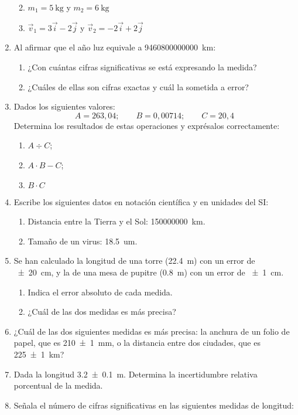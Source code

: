 \documentclass[
]{article}
\begin{document}
\begin{enumerate}
  \begin{enumerate}
  \def\labelenumii{\arabic{enumii}.}
  \item
    \(m_1 = \SI{5}{\kg}\) y \(m_2 = \SI{6}{\kg}\)
  \item
    \(\vec{v}_1 = 3\vec{i} - 2\vec{j}\) y
    \(\vec{v}_2 = -2\vec{i} + 2\vec{j}\)
  \end{enumerate}
\item
  Al afirmar que el año luz equivale a 9460800000000~km:

  \begin{enumerate}
  \def\labelenumii{\arabic{enumii}.}
  \item
    ¿Con cuántas cifras significativas se está expresando la medida?
  \item
    ¿Cuáles de ellas son cifras exactas y cuál la sometida a error?
  \end{enumerate}
\item
  Dados los siguientes valores:
  \[A = 263,04; \qquad B = 0,00714; \qquad C = 20,4\] Determina los
  resultados de estas operaciones y exprésalos correctamente:

  \begin{enumerate}
  \def\labelenumii{\arabic{enumii}.}
  \item
    \(A \div C\);
  \item
    \(A \cdot B - C\);
  \item
    \(B \cdot C\)
  \end{enumerate}
\item
  Escribe los siguientes datos en notación científica y en unidades del
  SI:

  \begin{enumerate}
  \def\labelenumii{\arabic{enumii}.}
  \item
    Distancia entre la Tierra y el Sol: 150000000~km.
  \item
    Tamaño de un virus: 18.5~um.
  \end{enumerate}
\item
  Se han calculado la longitud de una torre (22.4~m) con un error de
  ~±~20~cm, y la de una mesa de pupitre (0.8~m) con un error de ~±~1~cm.

  \begin{enumerate}
  \def\labelenumii{\arabic{enumii}.}
  \item
    Indica el error absoluto de cada medida.
  \item
    ¿Cuál de las dos medidas es más precisa?
  \end{enumerate}
\item
  ¿Cuál de las dos siguientes medidas es más precisa: la anchura de un
  folio de papel, que es 210~±~1~mm, o la distancia entre dos ciudades,
  que es 225~±~1~km?
\item
  Dada la longitud 3.2~±~0.1~m. Determina la incertidumbre relativa
  porcentual de la medida.
\item
  Señala el número de cifras significativas en las siguientes medidas de
  longitud:


\end{enumerate}
\end{document}
